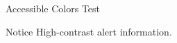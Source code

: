 \documentclass[14pt,t,accessible-colors=true]{beamer-accessibility}
\begin{document}
\begingroup
{}
\testfg
{}\testbg
{}
\endgroup
\begin{frame}{Accessible Colors Test}
\begin{alertblock}{Notice}
High-contrast alert information.
\end{alertblock}
\end{frame}
\end{document}
